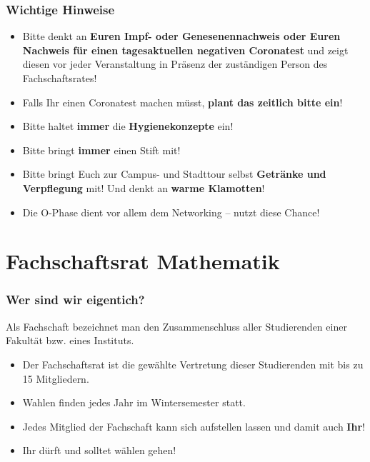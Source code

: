 \documentclass[10pt]{beamer}
\makeatletter
\newcommand{\highl}[1]{\color{tuccolor@ma}#1\color{black}}
\makeatother
\begin{document}
\begin{frame}

	\frametitle{Wichtige Hinweise}

	\begin{itemize}
		\item Bitte denkt an \textbf{Euren Impf- oder Genesenennachweis oder Euren Nachweis für einen tagesaktuellen negativen Coronatest} und zeigt diesen vor jeder Veranstaltung in Präsenz der zuständigen Person des Fachschaftsrates!
		\item Falls Ihr einen Coronatest machen müsst, \textbf{plant das zeitlich bitte ein}!
		\item Bitte haltet \textbf{immer} die \textbf{Hygienekonzepte} ein!
		\item Bitte bringt \textbf{immer} einen Stift mit!
		\item Bitte bringt Euch zur Campus- und Stadttour selbst \textbf{Getränke und Verpflegung} mit! Und denkt an \textbf{warme Klamotten}!
		\item \highl{Die O-Phase dient vor allem dem Networking -- nutzt diese Chance!}
	\end{itemize}
\end{frame}


\section{Fachschaftsrat Mathematik}
\frame{\tableofcontents[currentsection]}

\begin{frame}
	\frametitle{Wer sind wir eigentich?}

	\begin{block}{\vphantom{X}}
		Als Fachschaft bezeichnet man den Zusammenschluss aller Studierenden einer Fakultät bzw. eines Instituts.
	\end{block}

	\begin{itemize}
		\item Der Fachschaftsrat ist die gewählte Vertretung dieser Studierenden mit bis zu 15 Mitgliedern.
		\item Wahlen finden jedes Jahr im Wintersemester statt.
		\item Jedes Mitglied der Fachschaft kann sich aufstellen lassen und damit auch \textbf{Ihr}!
		\item \highl{Ihr dürft und solltet wählen gehen!}
	\end{itemize}
\end{frame}
\end{document}
